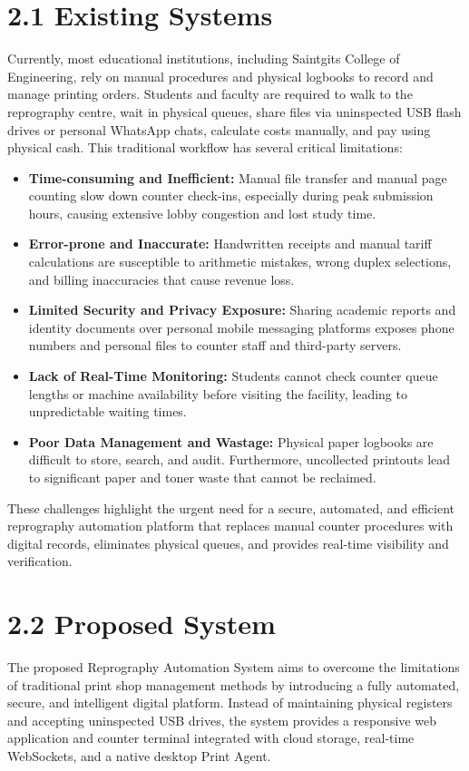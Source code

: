 \documentclass[12pt,a4paper]{report}
\begin{document}
\section{2.1 Existing Systems}
Currently, most educational institutions, including Saintgits College of Engineering, rely on manual procedures and physical logbooks to record and manage printing orders. Students and faculty are required to walk to the reprography centre, wait in physical queues, share files via uninspected USB flash drives or personal WhatsApp chats, calculate costs manually, and pay using physical cash. This traditional workflow has several critical limitations:
\begin{itemize}[leftmargin=0.35in, itemsep=3pt]
  \item \textbf{Time-consuming and Inefficient:} Manual file transfer and manual page counting slow down counter check-ins, especially during peak submission hours, causing extensive lobby congestion and lost study time.
  \item \textbf{Error-prone and Inaccurate:} Handwritten receipts and manual tariff calculations are susceptible to arithmetic mistakes, wrong duplex selections, and billing inaccuracies that cause revenue loss.
  \item \textbf{Limited Security and Privacy Exposure:} Sharing academic reports and identity documents over personal mobile messaging platforms exposes phone numbers and personal files to counter staff and third-party servers.
  \item \textbf{Lack of Real-Time Monitoring:} Students cannot check counter queue lengths or machine availability before visiting the facility, leading to unpredictable waiting times.
  \item \textbf{Poor Data Management and Wastage:} Physical paper logbooks are difficult to store, search, and audit. Furthermore, uncollected printouts lead to significant paper and toner waste that cannot be reclaimed.
\end{itemize}
These challenges highlight the urgent need for a secure, automated, and efficient reprography automation platform that replaces manual counter procedures with digital records, eliminates physical queues, and provides real-time visibility and verification.

\section{2.2 Proposed System}
The proposed Reprography Automation System aims to overcome the limitations of traditional print shop management methods by introducing a fully automated, secure, and intelligent digital platform. Instead of maintaining physical registers and accepting uninspected USB drives, the system provides a responsive web application and counter terminal integrated with cloud storage, real-time WebSockets, and a native desktop Print Agent.
\end{document}
